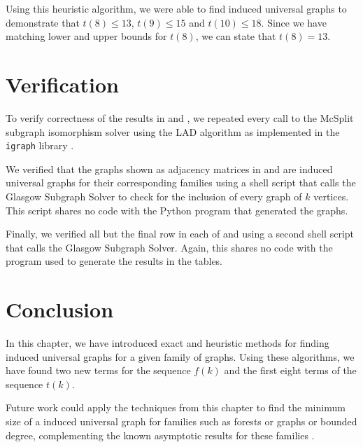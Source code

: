 Using this heuristic algorithm, we were able to find induced universal graphs
to demonstrate that $t(8) \leq 13$, $t(9) \leq 15$ and $t(10) \leq 18$.
Since we have matching lower and upper bounds for $t(8)$, we can state
that $t(8) = 13$.

\section{Verification}\label{sec:verification}

To verify correctness of the results in
 and , we repeated every call to
the McSplit subgraph isomorphism solver using the LAD algorithm \cite{DBLP:journals/ai/Solnon10}
as implemented in the \texttt{igraph} library \cite{igraph}.

We verified that the graphs shown as adjacency matrices in 
and  are induced universal graphs for their corresponding families
using a shell script that calls the Glasgow Subgraph Solver \cite{DBLP:conf/cp/McCreeshP15,DBLP:conf/gg/McCreeshP020} to check for the
inclusion of every graph of $k$ vertices.
This script shares no code with the Python program that generated the graphs.

Finally, we verified all but the final row in each of 
and  using a second shell script that calls the Glasgow
Subgraph Solver.  Again, this shares no code with the program used to generate
the results in the tables.

\section{Conclusion}

In this chapter, we have introduced exact and heuristic methods for
finding induced universal graphs for a given family of graphs.  Using these algorithms,
we have found two new terms for the sequence $f(k)$ and the first eight terms
of the sequence $t(k)$.

Future work could apply the techniques from this chapter to find
the minimum size of a induced universal graph for families such as
forests or graphs or bounded degree, complementing the known asymptotic
results for these families \cite{DBLP:journals/jacm/AlstrupDK17,
DBLP:conf/icalp/AbrahamsenAHKS17}.

